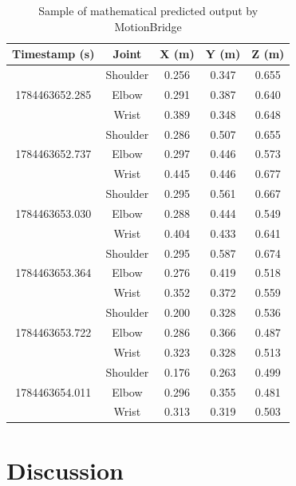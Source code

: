 \begin{table}[H]
\centering
\caption{Sample of mathematical predicted output by MotionBridge}
\label{tab:dataset-sample}
\renewcommand{\arraystretch}{1.2} %
\begin{tabular}{ccccc}
\hline
\textbf{Timestamp (s)} & \textbf{Joint} & \textbf{X (m)} & \textbf{Y (m)} & \textbf{Z (m)} \\ \hline

\multirow{3}{*}{1784463652.285} & Shoulder & 0.256 & 0.347 & 0.655 \\
 & Elbow & 0.291 & 0.387 & 0.640 \\
 & Wrist & 0.389 & 0.348 & 0.648 \\ \hline

\multirow{3}{*}{1784463652.737} & Shoulder & 0.286 & 0.507 & 0.655 \\
 & Elbow & 0.297 & 0.446 & 0.573 \\
 & Wrist & 0.445 & 0.446 & 0.677 \\ \hline

\multirow{3}{*}{1784463653.030} & Shoulder & 0.295 & 0.561 & 0.667 \\
 & Elbow & 0.288 & 0.444 & 0.549 \\
 & Wrist & 0.404 & 0.433 & 0.641 \\ \hline

\multirow{3}{*}{1784463653.364} & Shoulder & 0.295 & 0.587 & 0.674 \\
 & Elbow & 0.276 & 0.419 & 0.518 \\
 & Wrist & 0.352 & 0.372 & 0.559 \\ \hline

\multirow{3}{*}{1784463653.722} & Shoulder & 0.200 & 0.328 & 0.536 \\
 & Elbow & 0.286 & 0.366 & 0.487 \\
 & Wrist & 0.323 & 0.328 & 0.513 \\ \hline

\multirow{3}{*}{1784463654.011} & Shoulder & 0.176 & 0.263 & 0.499 \\
 & Elbow & 0.296 & 0.355 & 0.481 \\
 & Wrist & 0.313 & 0.319 & 0.503 \\ \hline
\end{tabular}
\end{table}

\section{Discussion}

